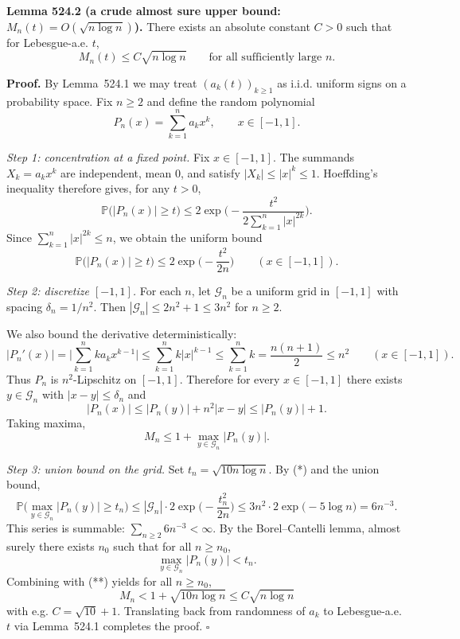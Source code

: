 \medskip
\noindent\textbf{Lemma 524.2 (a crude almost sure upper bound: $M_n(t)=O(\sqrt{n\log n})$).}
There exists an absolute constant $C>0$ such that for Lebesgue-a.e. $t$,
\[M_n(t) \le C\sqrt{n\log n}\qquad\text{for all sufficiently large }n.
\]

\noindent\textbf{Proof.}
By Lemma~524.1 we may treat $(a_k(t))_{k\ge 1}$ as i.i.d. uniform signs on a probability space.
Fix $n\ge 2$ and define the random polynomial
\[P_n(x)=\sum_{k=1}^n a_k x^k,\qquad x\in[-1,1].
\]

\emph{Step 1: concentration at a fixed point.}
Fix $x\in[-1,1]$. The summands $X_k=a_k x^k$ are independent, mean $0$, and satisfy $|X_k|\le |x|^k\le 1$.
Hoeffding's inequality therefore gives, for any $t>0$,
\[\mathbb P\big(|P_n(x)|\ge t\big) \le 2\exp\Big(-\frac{t^2}{2\sum_{k=1}^n |x|^{2k}}\Big).
\]
Since $\sum_{k=1}^n |x|^{2k}\le n$, we obtain the uniform bound
\[\mathbb P\big(|P_n(x)|\ge t\big) \le 2\exp\Big(-\frac{t^2}{2n}\Big)\qquad (x\in[-1,1]). \tag{*}
\]

\emph{Step 2: discretize $[-1,1]$.}
For each $n$, let $\mathcal G_n$ be a uniform grid in $[-1,1]$ with spacing $\delta_n=1/n^2$.
Then $|\mathcal G_n|\le 2n^2+1\le 3n^2$ for $n\ge 2$.

We also bound the derivative deterministically:
\[|P_n'(x)| = \Big|\sum_{k=1}^n k a_k x^{k-1}\Big| \le \sum_{k=1}^n k |x|^{k-1} \le \sum_{k=1}^n k = \frac{n(n+1)}{2} \le n^2\qquad (x\in[-1,1]).\]
Thus $P_n$ is $n^2$-Lipschitz on $[-1,1]$.
Therefore for every $x\in[-1,1]$ there exists $y\in\mathcal G_n$ with $|x-y|\le\delta_n$ and
\[|P_n(x)|\le |P_n(y)| + n^2|x-y| \le |P_n(y)|+1.
\]
Taking maxima,
\[M_n\le 1 + \max_{y\in\mathcal G_n} |P_n(y)|.\tag{**}
\]

\emph{Step 3: union bound on the grid.}
Set $t_n=\sqrt{10 n\log n}$. By (*) and the union bound,
\[\mathbb P\Big(\max_{y\in\mathcal G_n}|P_n(y)|\ge t_n\Big)
\le |\mathcal G_n|\cdot 2\exp\Big(-\frac{t_n^2}{2n}\Big)
\le 3n^2\cdot 2\exp\big(-5\log n\big)
=6 n^{-3}.
\]
This series is summable: $\sum_{n\ge 2} 6n^{-3}<\infty$.
By the Borel--Cantelli lemma, almost surely there exists $n_0$ such that for all $n\ge n_0$,
\[\max_{y\in\mathcal G_n}|P_n(y)|<t_n.
\]
Combining with (**) yields for all $n\ge n_0$,
\[M_n < 1 + \sqrt{10 n\log n} \le C\sqrt{n\log n}
\]
with e.g. $C=\sqrt{10}+1$.
Translating back from randomness of $a_k$ to Lebesgue-a.e. $t$ via Lemma~524.1 completes the proof.
\hfill$\square$

